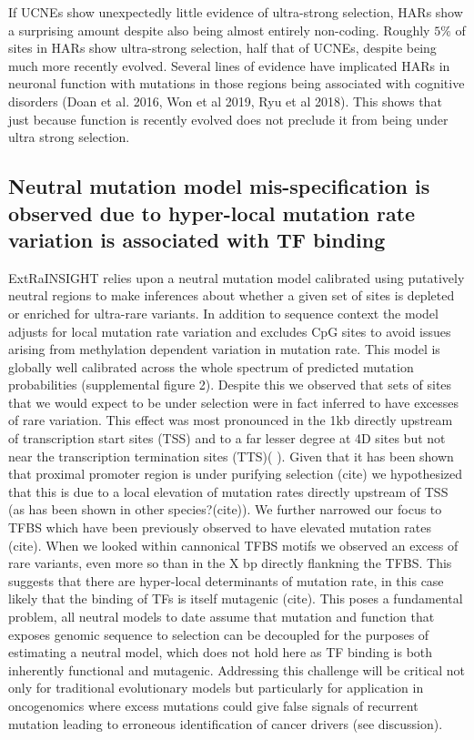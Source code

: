 \documentclass[11pt]{article}
\begin{document}
If UCNEs show unexpectedly little evidence of ultra-strong selection, HARs show a surprising amount despite also being almost entirely non-coding. Roughly $5\%$ of sites in HARs show ultra-strong selection, half that of UCNEs, despite being much more recently evolved. Several lines of evidence have implicated HARs in neuronal function with mutations in those regions being associated with cognitive disorders (Doan et al. 2016, Won et al 2019, Ryu et al 2018). This shows that just because function is recently evolved does not preclude it from being under ultra strong selection. 

\subsection*{Neutral mutation model mis-specification is observed due to hyper-local mutation rate variation is associated with TF binding}

ExtRaINSIGHT relies upon a neutral mutation model calibrated using putatively neutral regions to make inferences about whether a given set of sites is depleted or enriched for ultra-rare variants. In addition to sequence context the model adjusts for local mutation rate variation and excludes CpG sites to avoid issues arising from methylation dependent variation in mutation rate. This model is globally well calibrated across the whole spectrum of predicted mutation probabilities (supplemental figure 2). Despite this we observed that sets of sites that we would expect to be under selection were in fact inferred to have excesses of rare variation. This effect was most pronounced in the 1kb directly upstream of transcription start sites (TSS) and to a far lesser degree at 4D sites but not near the transcription termination sites (TTS)(  ). Given that it has been shown that proximal promoter region is under purifying selection (cite) we hypothesized that this is due to a local elevation of mutation rates directly upstream of TSS  (as has been shown in other species?(cite)). We further narrowed our focus to TFBS which have been previously observed to have elevated mutation rates (cite). When we looked within cannonical TFBS motifs we observed an excess of rare variants, even more so than in the X bp directly flankning the TFBS. This suggests that there are hyper-local determinants of mutation rate, in this case likely that the binding of TFs is itself mutagenic (cite). This poses a fundamental problem, all neutral models to date assume that mutation and function that exposes genomic sequence to selection can be decoupled for the purposes of estimating a neutral model, which does not hold here as TF binding is both inherently functional and mutagenic. Addressing this challenge will be critical not only for traditional evolutionary models but particularly for application in oncogenomics where excess mutations could give false signals of recurrent mutation leading to erroneous identification of cancer drivers (see discussion).
\end{document}
